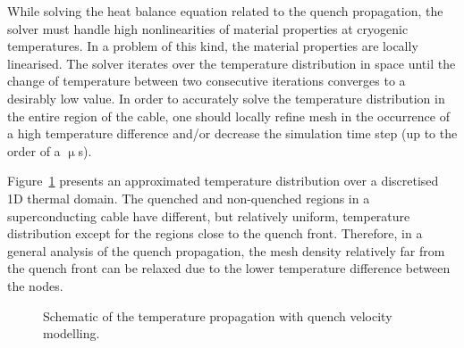 
While solving the heat balance equation related to the quench propagation, the solver must handle high nonlinearities of material properties at cryogenic temperatures. In a problem of this kind, the material properties are locally linearised. The solver iterates over the temperature distribution in space until the change of temperature between two consecutive iterations converges to a desirably low value. In order to accurately solve the temperature distribution in the entire region of the cable, one should locally refine mesh in the occurrence of a high temperature difference and/or decrease the simulation time step (up to the order of a $\upmu$s).

Figure~\ref{fig:modelling_approach} presents an approximated temperature distribution over a discretised 1D thermal domain. The quenched and non-quenched regions in a superconducting cable have different, but relatively uniform, temperature distribution except for the regions close to the quench front. Therefore, in a general analysis of the quench propagation, the mesh density relatively far from the quench front can be relaxed due to the lower temperature difference between the nodes. 

\begin{figure}[H]
\centering
{}
\caption{Schematic of the temperature propagation with quench velocity modelling.}
\label{fig:modelling_approach}
\end{figure}

